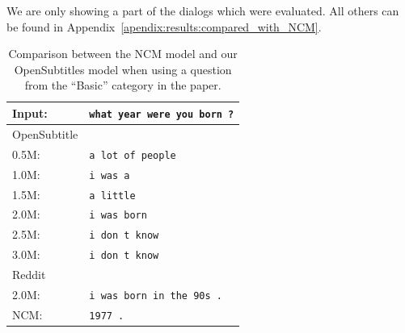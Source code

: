 We are only showing a part of the dialogs which were evaluated. All others can be found in Appendix~\ref{apendix:results:compared_with_NCM}.
\\
\begin{table}[H]
	\centering
	\begin{adjustbox}{max width=\textwidth}
		\begin{tabular}{ll}
			\toprule
			Input: 	& \texttt{what year were you born ?}\\
			\midrule
			OpenSubtitle\\
			0.5M: 	& \texttt{a lot of people}\\
			1.0M: 	& \texttt{i was a}\\
			1.5M:	& \texttt{a little}\\
			2.0M:	& \texttt{i was born}\\
			2.5M:	& \texttt{i don t know}\\
			3.0M:	& \texttt{i don t know}\\
			\midrule
			Reddit\\
			2.0M:	& \texttt{i was born in the 90s .}\\
			\midrule
			NCM:	& \texttt{1977 .}\\
			\bottomrule
		\end{tabular}
	\end{adjustbox}
	\caption{Comparison between the NCM model and our OpenSubtitles model when using a question from the ``Basic'' category in the paper.}
	\label{results:example8_output:Neural_Conversational_Model_compared}
\end{table}

